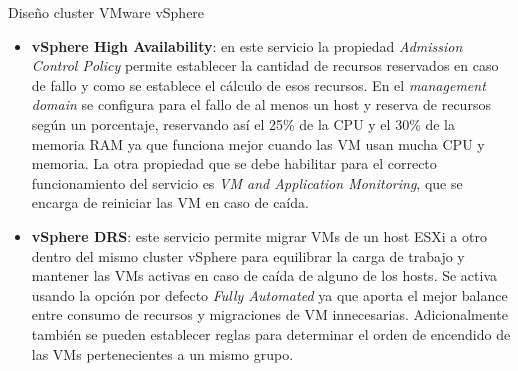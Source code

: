 \begin{subsubsection}{Diseño cluster VMware vSphere}
\begin{itemize}
    \item \textbf{vSphere High Availability}: en este servicio la propiedad \textit{Admission Control Policy} permite establecer la cantidad de recursos reservados en caso de fallo y como se establece el cálculo de esos recursos. En el \textit{management domain} se configura para el fallo de al menos un host y reserva de recursos según un porcentaje, reservando así el 25\% de la CPU y el 30\% de la memoria RAM ya que funciona mejor cuando las VM usan mucha CPU y memoria. La otra propiedad que se debe habilitar para el correcto funcionamiento del servicio es \textit{VM and Application Monitoring}, que se encarga de reiniciar las VM en caso de caída.
    \item \textbf{vSphere DRS}: este servicio permite migrar VMs de un host ESXi a otro dentro del mismo cluster vSphere para equilibrar la carga de trabajo y mantener las VMs activas en caso de caída de alguno de los hosts. Se activa usando la opción por defecto \textit{Fully Automated} ya que aporta el mejor balance entre consumo de recursos y migraciones de VM innecesarias. Adicionalmente también se pueden establecer reglas para determinar el orden de encendido de las VMs pertenecientes a un mismo grupo. 
\end{itemize}
\end{subsubsection}
